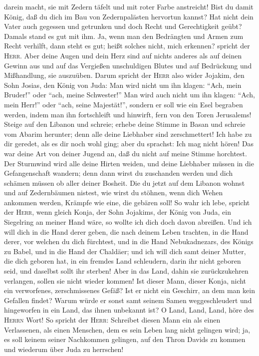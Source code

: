 darein macht, sie mit Zedern täfelt und mit roter Farbe anstreicht!
 Bist du damit König, daß du dich im Bau von
Zedernpalästen hervortun kannst? Hat nicht dein Vater auch gegessen und
getrunken und doch Recht und Gerechtigkeit geübt? Damals stand es gut
mit ihm.  Ja, wenn man den Bedrängten und Armen zum Recht
verhilft, dann steht es gut; heißt solches nicht, mich erkennen? spricht
der \textsc{Herr}.  Aber deine Augen und dein Herz sind
auf nichts anderes als auf deinen Gewinn aus und auf das Vergießen
unschuldigen Blutes und auf Bedrückung und Mißhandlung, sie auszuüben.
 Darum spricht der \textsc{Herr} also wider Jojakim, den
Sohn Josias, den König von Juda: Man wird nicht um ihn klagen: ``Ach,
mein Bruder!'' oder ``ach, meine Schwester!'' Man wird auch nicht um ihn
klagen: ``Ach, mein Herr!'' oder ``ach, seine Majestät!'',
 sondern er soll wie ein Esel begraben werden, indem man
ihn fortschleift und hinwirft, fern von den Toren Jerusalems!
 Steige auf den Libanon und schreie; erhebe deine Stimme
in Basan und schreie vom Abarim herunter; denn alle deine Liebhaber sind
zerschmettert!  Ich habe zu dir geredet, als es dir noch
wohl ging; aber du sprachst: Ich mag nicht hören! Das war deine Art von
deiner Jugend an, daß du nicht auf meine Stimme horchtest.
 Der Sturmwind wird alle deine Hirten weiden, und deine
Liebhaber müssen in die Gefangenschaft wandern; denn dann wirst du
zuschanden werden und dich schämen müssen ob aller deiner Bosheit.
 Die du jetzt auf dem Libanon wohnst und auf Zedernbäumen
nistest, wie wirst du stöhnen, wenn dich Wehen ankommen werden, Krämpfe
wie eine, die gebären soll!  So wahr ich lebe, spricht
der \textsc{Herr}, wenn gleich Konja, der Sohn Jojakims, der König von
Juda, ein Siegelring an meiner Hand wäre, so wollte ich dich doch davon
abreißen.  Und ich will dich in die Hand derer geben, die
nach deinem Leben trachten, in die Hand derer, vor welchen du dich
fürchtest, und in die Hand Nebukadnezars, des Königs zu Babel, und in
die Hand der Chaldäer;  und ich will dich samt deiner
Mutter, die dich geboren hat, in ein fremdes Land schleudern, darin ihr
nicht geboren seid, und daselbst sollt ihr sterben!  Aber
in das Land, dahin sie zurückzukehren verlangen, sollen sie nicht wieder
kommen!  Ist dieser Mann, dieser Konja, nicht ein
verworfenes, zerschmissenes Gefäß? Ist er nicht ein Geschirr, an dem man
kein Gefallen findet? Warum würde er sonst samt seinem Samen
weggeschleudert und hingeworfen in ein Land, das ihnen unbekannt ist?
 O Land, Land, Land, höre des \textsc{Herrn} Wort!
 So spricht der \textsc{Herr}: Schreibet diesen Mann ein
als einen Verlassenen, als einen Menschen, dem es sein Leben lang nicht
gelingen wird; ja, es soll keinem seiner Nachkommen gelingen, auf den
Thron Davids zu kommen und wiederum über Juda zu herrschen!

